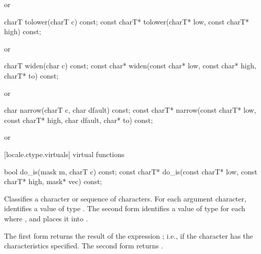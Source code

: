\begin{itemdescr}
\pnum
\returns
{}
or
\end{itemdescr}

%
%
\begin{itemdecl}
charT        tolower(charT c) const;
const charT* tolower(charT* low, const charT* high) const;
\end{itemdecl}

\begin{itemdescr}
\pnum
\returns
{}
or
\end{itemdescr}

%
%
\begin{itemdecl}
charT       widen(char c) const;
const char* widen(const char* low, const char* high, charT* to) const;
\end{itemdecl}

\begin{itemdescr}
\pnum
\returns
{}
or
\end{itemdescr}

%
%
\begin{itemdecl}
char         narrow(charT c, char dfault) const;
const charT* narrow(const charT* low, const charT* high, char dfault,
                    char* to) const;
\end{itemdecl}

\begin{itemdescr}
\pnum
\returns
{}
or
\end{itemdescr}

[locale.ctype.virtuals]{ virtual functions}

%
%
\begin{itemdecl}
bool         do_is(mask m, charT c) const;
const charT* do_is(const charT* low, const charT* high,
                   mask* vec) const;
\end{itemdecl}

\begin{itemdescr}
\pnum
\effects
Classifies a character or sequence of characters.
For each argument character, identifies a value
of type
.
The second form identifies a value  of type
for each
where
,
and places it into
.

\pnum
\returns
The first form returns the result of the expression
;
i.e.,
if the character has the characteristics specified.
The second form returns .
\end{itemdescr}


